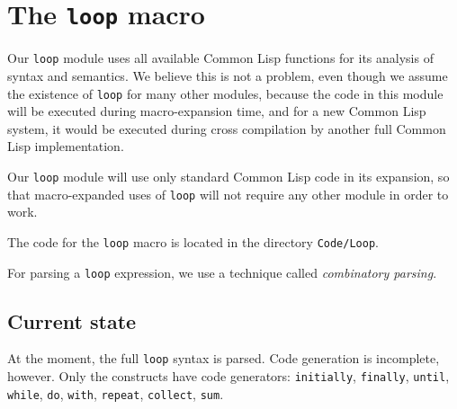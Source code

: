 \chapter{The \texttt{loop} macro} 

Our \texttt{loop} module uses all available Common Lisp functions for
its analysis of syntax and semantics.  We believe this is not a
problem, even though we assume the existence of \texttt{loop} for many
other modules, because the code in this module will be executed during
macro-expansion time, and for a new Common Lisp system, it would be
executed during cross compilation by another full Common Lisp
implementation.

Our \texttt{loop} module will use only standard Common Lisp code in
its expansion, so that macro-expanded uses of \texttt{loop} will not
require any other \sysname{} module in order to work.  

The code for the \sysname{} \texttt{loop} macro is located in the
directory \texttt{Code/Loop}.  

For parsing a \texttt{loop} expression, we use a technique called
\emph{combinatory parsing}.

\section{Current state}

At the moment, the full \texttt{loop} syntax is parsed.  Code
generation is incomplete, however.  Only the constructs have code
generators: \texttt{initially}, \texttt{finally}, \texttt{until},
\texttt{while}, \texttt{do}, \texttt{with}, \texttt{repeat},
\texttt{collect}, \texttt{sum}.



